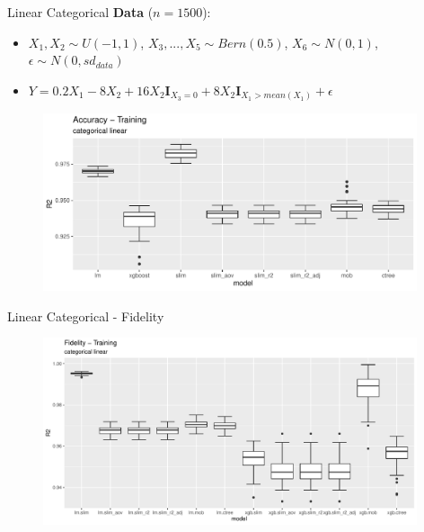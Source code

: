 \documentclass[9pt, xcolor=table]{beamer}
\begin{document}
\begin{frame}{Linear Categorical}
\textbf{Data} ($n= 1500$):
\begin{itemize}
    \item $X_1, X_2 \sim U(-1,1)$, $X_3, ..., X_5 \sim Bern(0.5)$, $X_6 \sim N(0,1)$,  $\epsilon \sim N(0, sd_{data})$
    \item $ Y =  0.2  X_{1} - 8  X_2 + 16  X_2  \mathbf{I}_{X_3 = 0} + 8  X_2  \mathbf{I}_{X_1 > mean(X_1)} + \epsilon $
\end{itemize}

\begin{figure}
    \includegraphics[width=11cm]{Figures/Performance/categorical_linear/r2_acc_train.pdf}
\end{figure}
\end{frame}

\begin{frame}{Linear Categorical - Fidelity}
\begin{figure}
    \includegraphics[width=11cm]{Figures/Performance/categorical_linear/r2_fidelity_train.pdf}
\end{figure}
\end{frame}
\end{document}
